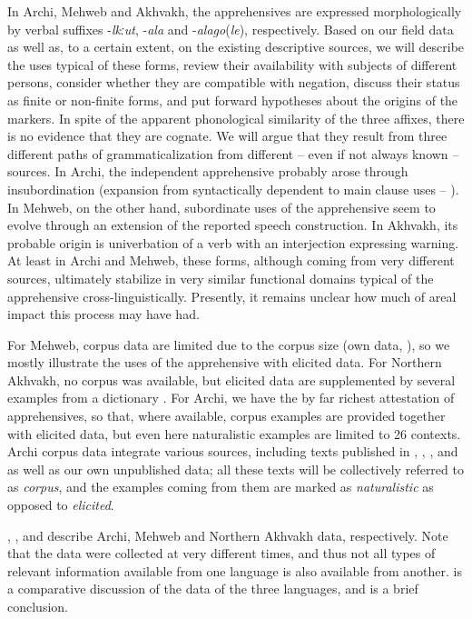 \documentclass[output=paper,colorlinks,citecolor=brown]{langscibook}
\begin{document}
In Archi, Mehweb and Akhvakh, the apprehensives are expressed morphologically by verbal suffixes \nobreakdash-\textit{lkːut}, \nobreakdash-\textit{ala} and \nobreakdash-\textit{alago}(\textit{le}), respectively. Based on our field data as well as, to a certain extent, on the existing descriptive sources, we will describe the uses typical of these forms, review their availability with subjects of different persons, consider whether they are compatible with negation, discuss their status as finite or non-finite forms, and put forward hypotheses about the origins of the markers. In spite of the apparent phonological similarity of the three affixes, there is no evidence that they are cognate. We will argue that they result from three different paths of grammaticalization from different -- even if not always known -- sources. In Archi, the independent apprehensive probably arose through insubordination (expansion from syntactically dependent to main clause uses -- \citealt{evans2007insubordination}). In Mehweb, on the other hand, subordinate uses of the apprehensive seem to evolve through an extension of the reported speech construction. In Akhvakh, its probable origin is univerbation of a verb with an interjection expressing warning. At least in Archi and Mehweb, these forms, although coming from very different sources, ultimately stabilize in very similar functional domains typical of the apprehensive cross-linguistically. Presently, it remains unclear how much of areal impact this process may have had.

For Mehweb, corpus data are limited due to the corpus size (own data, \citealt{Magometov1982}), so we mostly illustrate the uses of the apprehensive with elicited data. For Northern Akhvakh, no corpus was available, but elicited data are supplemented by several examples from a dictionary \citep{MagomedovaAbdulaeva2007}. For Archi, we have the by far richest attestation of apprehensives, so that, where available, corpus examples are provided together with elicited data, but even here naturalistic examples are limited to 26 contexts. Archi corpus data integrate various sources, including texts published in \citet{Dirr1908}, \citet{Mikailov1967}, \citet{Kibrik1977}, and \citet{SamedovMagdilova2017a, SamedovMagdilova2017b} as well as our own unpublished data; all these texts will be collectively referred to as \textit{corpus}, and the examples coming from them are marked as \textit{naturalistic} as opposed to \textit{elicited}.

,  , and  describe Archi, Mehweb and Northern Akhvakh data, respectively. Note that the data were collected at very different times, and thus not all types of relevant information available from one language is also available from another.  is a comparative discussion of the data of the three languages, and  is a brief conclusion.
\end{document}
